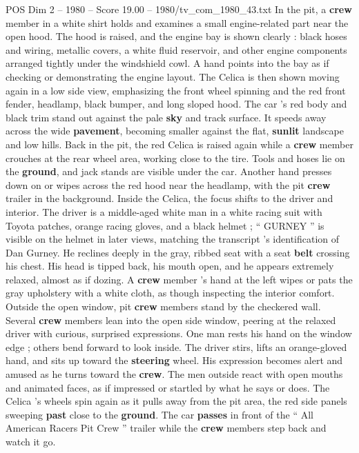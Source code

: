 \begin{textsample}{POS Dim 2 – 1980 – Score 19.00 – 1980/tv\_com\_1980\_43.txt}
In the pit, a \textbf{crew} member in a white shirt holds and examines a small engine-related part near the open hood.
The hood is raised, and the engine bay is shown clearly : black hoses and wiring, metallic covers, a white fluid reservoir, and other engine components arranged tightly under the windshield cowl.
A hand points into the bay as if checking or demonstrating the engine layout.
The Celica is then shown moving again in a low side view, emphasizing the front wheel spinning and the red front fender, headlamp, black bumper, and long sloped hood.
The car ’s red body and black trim stand out against the pale \textbf{sky} and track surface.
It speeds away across the wide \textbf{pavement}, becoming smaller against the flat, \textbf{sunlit} landscape and low hills.
Back in the pit, the red Celica is raised again while a \textbf{crew} member crouches at the rear wheel area, working close to the tire.
Tools and hoses lie on the \textbf{ground}, and jack stands are visible under the car.
Another hand presses down on or wipes across the red hood near the headlamp, with the pit \textbf{crew} trailer in the background.
Inside the Celica, the focus shifts to the driver and interior.
The driver is a middle-aged white man in a white racing suit with Toyota patches, orange racing gloves, and a black helmet ; “ GURNEY ” is visible on the helmet in later views, matching the transcript ’s identification of Dan Gurney.
He reclines deeply in the gray, ribbed seat with a seat \textbf{belt} crossing his chest.
His head is tipped back, his mouth open, and he appears extremely relaxed, almost as if dozing.
A \textbf{crew} member ’s hand at the left wipes or pats the gray upholstery with a white cloth, as though inspecting the interior comfort.
Outside the open window, pit \textbf{crew} members stand by the checkered wall.
Several \textbf{crew} members lean into the open side window, peering at the relaxed driver with curious, surprised expressions.
One man rests his hand on the window edge ; others bend forward to look inside.
The driver stirs, lifts an orange-gloved hand, and sits up toward the \textbf{steering} wheel.
His expression becomes alert and amused as he turns toward the \textbf{crew}.
The men outside react with open mouths and animated faces, as if impressed or startled by what he says or does.
The Celica ’s wheels spin again as it pulls away from the pit area, the red side panels sweeping \textbf{past} close to the \textbf{ground}.
The car \textbf{passes} in front of the “ All American Racers Pit Crew ” trailer while the \textbf{crew} members step back and watch it go.

\end{textsample}
